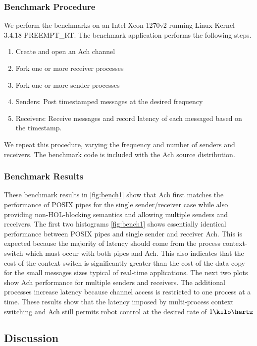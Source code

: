 \documentclass[letterpaper]{IEEEtran}
\begin{document}
\subsubsection{Benchmark Procedure}
We perform the benchmarks on an Intel Xeon 1270v2 running Linux Kernel
3.4.18 PREEMPT\_RT.  The benchmark application performs the following
steps.
\begin{enumerate}
  \item Create and open an Ach channel
  \item Fork one or more receiver processes
  \item Fork one or more sender processes
  \item Senders: Post timestamped messages at the desired frequency
  \item Receivers: Receive messages and record latency of each
    messaged based on the timestamp.
\end{enumerate}
We repeat this procedure, varying the frequency and number of senders
and receivers.  The benchmark code is included with the Ach source
distribution.

\subsubsection{Benchmark Results}

These benchmark results in \autoref{fig:bench1} show that Ach first
matches the performance of POSIX pipes for the single sender/receiver
case while also providing non-HOL-blocking semantics and allowing
multiple senders and receivers.  The first two histograms
\autoref{fig:bench1} shows essentially identical performance between
POSIX pipes and single sender and receiver Ach.  This is expected
because the majority of latency should come from the process
context-switch which must occur with both pipes and Ach.  This also
indicates that the cost of the context switch is significantly greater
than the cost of the data copy for the small messages sizes typical of
real-time applications.  The next two plots show Ach performance for
multiple senders and receivers.  The additional processes increase
latency because channel access is restricted to one process at a time.
These results show that the latency imposed by multi-process context
switching and Ach still permits robot control at the desired rate of
$1 \kilo\hertz$

\subsection{Discussion}
\end{document}
